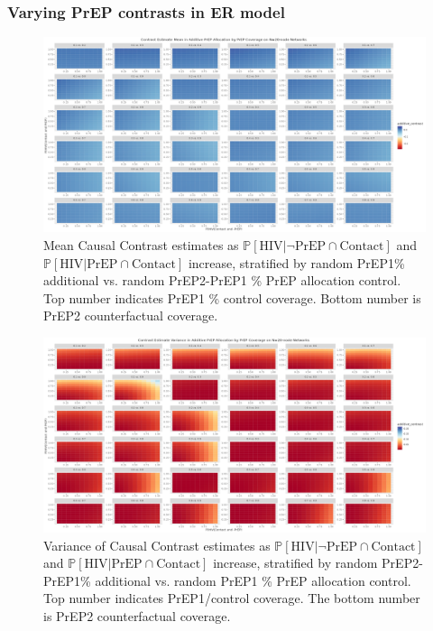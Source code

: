 \documentclass{article}
\theoremstyle{definition}
\begin{document}
\subsubsection{Varying PrEP contrasts in ER model}
\begin{figure}[H]
    \centering
    \includegraphics[width=\linewidth]{Corrected Figures/PrEP Additive Mean Plots.png}
    \caption{Mean Causal Contrast estimates as $\mathbb{P}\left[\text{HIV} \vert \neg \text{PrEP} \cap \text{Contact}\right]$ and $\mathbb{P}\left[\text{HIV} \vert \text{PrEP} \cap \text{Contact}\right]$ increase, stratified by random PrEP1\% additional vs. random PrEP2-PrEP1 \% PrEP allocation control. Top number indicates PrEP1 \% control coverage. Bottom number is PrEP2 counterfactual coverage. }
    \label{fig:Figure S4.11}
\end{figure}
\begin{figure}[H]
    \centering
    \includegraphics[width=\linewidth]{Corrected Figures/PrEP Additive Variance Plots.png}
    \caption{Variance of Causal Contrast estimates as $\mathbb{P}\left[\text{HIV} \vert \neg \text{PrEP} \cap \text{Contact}\right]$ and $\mathbb{P}\left[\text{HIV} \vert \text{PrEP} \cap \text{Contact}\right]$ increase, stratified by random PrEP2-PrEP1\% additional vs. random PrEP1 \% PrEP allocation control. Top number indicates PrEP1/control coverage. The bottom number is PrEP2 counterfactual coverage.}
    \label{fig:Figure S4.12}
\end{figure}
\end{document}
